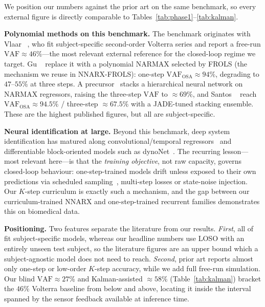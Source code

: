 \documentclass[10pt,twocolumn,letterpaper]{article}
\begin{document}
We position our numbers against the prior art on the same benchmark, so
every external figure is directly comparable to
Tables~\ref{tab:phase1}--\ref{tab:kalman}.

\noindent\textbf{Polynomial methods on this benchmark.}
The benchmark originates with Vlaar \etal~\cite{Vlaar2018}, who fit
subject-specific second-order Volterra series and report a free-run
$\mathrm{VAF}\approx 46\%$---the most relevant external reference for the
closed-loop regime we target. Gu \etal~\cite{Gu2021} replace it with a
polynomial NARMAX selected by FROLS (the mechanism we reuse in
NNARX-FROLS): one-step $\mathrm{VAF_{OSA}}\approx 94\%$, degrading to
$47$--$55\%$ at three steps. A precursor~\cite{Gu2018} stacks a
hierarchical neural network on NARMAX regressors, raising the three-step
$\mathrm{VAF}$ to $\approx 69\%$, and Santos \etal~\cite{Santos2023} reach
$\mathrm{VAF_{OSA}}\approx 94.5\%$ / three-step $\approx 67.5\%$ with a
JADE-tuned stacking ensemble. These are the highest published figures, but
all are subject-specific.

\noindent\textbf{Neural identification at large.}
Beyond this benchmark, deep system identification has matured along
convolutional/temporal regressors~\cite{CourseMaterial} and differentiable
block-oriented models such as dynoNet~\cite{CourseMaterial}. The recurring
lesson---most relevant here---is that the \emph{training objective}, not
raw capacity, governs closed-loop behaviour: one-step-trained models drift
unless exposed to their own predictions via scheduled
sampling~\cite{CourseMaterial}, multi-step losses or state-noise injection. Our
$K$-step curriculum is exactly such a mechanism, and the gap between our
curriculum-trained NNARX and one-step-trained recurrent families
demonstrates this on biomedical data.

\noindent\textbf{Positioning.}
Two features separate the literature from our results. \emph{First}, all
of~\cite{Vlaar2018,Gu2018,Gu2021,Santos2023} fit subject-specific models,
whereas our headline numbers use LOSO with an entirely unseen test subject,
so the literature figures are an upper bound which a subject-agnostic model does not need
to reach. \emph{Second}, prior art reports almost only one-step or
low-order $K$-step accuracy, while we add full free-run simulation. Our
blind $\mathrm{VAF}\approx 27\%$ and Kalman-assisted $\approx 58\%$
(Table~\ref{tab:kalman}) bracket the $46\%$ Volterra baseline from below
and above, locating it inside the interval spanned by the sensor feedback
available at inference time.
\end{document}
